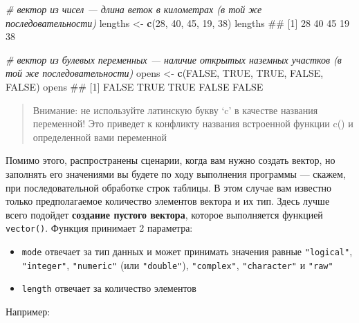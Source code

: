 \documentclass[]{book}
\newenvironment{Shaded}{\begin{snugshade}}{\end{snugshade}}
\newcommand{\KeywordTok}[1]{\textcolor[rgb]{0.13,0.29,0.53}{\textbf{#1}}}
\newcommand{\DecValTok}[1]{\textcolor[rgb]{0.00,0.00,0.81}{#1}}
\newcommand{\StringTok}[1]{\textcolor[rgb]{0.31,0.60,0.02}{#1}}
\newcommand{\CommentTok}[1]{\textcolor[rgb]{0.56,0.35,0.01}{\textit{#1}}}
\newcommand{\OtherTok}[1]{\textcolor[rgb]{0.56,0.35,0.01}{#1}}
\newcommand{\NormalTok}[1]{#1}
\providecommand{\tightlist}{%
  \setlength{\itemsep}{0pt}\setlength{\parskip}{0pt}}
\begin{document}
\begin{Shaded}
\begin{Highlighting}[]
\CommentTok{# вектор из чисел — длина веток в километрах (в той же последовательности)}
\NormalTok{lengths <-}\StringTok{ }\KeywordTok{c}\NormalTok{(}\DecValTok{28}\NormalTok{, }\DecValTok{40}\NormalTok{, }\DecValTok{45}\NormalTok{, }\DecValTok{19}\NormalTok{, }\DecValTok{38}\NormalTok{)}
\NormalTok{lengths}
\NormalTok{## [1] 28 40 45 19 38}
\end{Highlighting}
\end{Shaded}

\begin{Shaded}
\begin{Highlighting}[]
\CommentTok{# вектор из булевых переменных — наличие  открытых наземных участков (в той же последовательности)}
\NormalTok{opens <-}\StringTok{ }\KeywordTok{c}\NormalTok{(}\OtherTok{FALSE}\NormalTok{, }\OtherTok{TRUE}\NormalTok{, }\OtherTok{TRUE}\NormalTok{, }\OtherTok{FALSE}\NormalTok{, }\OtherTok{FALSE}\NormalTok{)}
\NormalTok{opens}
\NormalTok{## [1] FALSE  TRUE  TRUE FALSE FALSE}
\end{Highlighting}
\end{Shaded}

\begin{quote}
Внимание: не используйте латинскую букву `c' в качестве названия
переменной! Это приведет к конфликту названия встроенной функции c() и
определенной вами переменной
\end{quote}

Помимо этого, распространены сценарии, когда вам нужно создать вектор,
но заполнять его значениями вы будете по ходу выполнения программы ---
скажем, при последовательной обработке строк таблицы. В этом случае вам
известно только предполагаемое количество элементов вектора и их тип.
Здесь лучше всего подойдет \textbf{создание пустого вектора}, которое
выполняется функцией \texttt{vector()}. Функция принимает 2 параметра:

\begin{itemize}
\tightlist
\item
  \texttt{mode} отвечает за тип данных и может принимать значения равные
  \texttt{"logical"}, \texttt{"integer"}, \texttt{"numeric"} (или
  \texttt{"double"}), \texttt{"complex"}, \texttt{"character"} и
  \texttt{"raw"}
\item
  \texttt{length} отвечает за количество элементов
\end{itemize}

Например:
\end{document}
